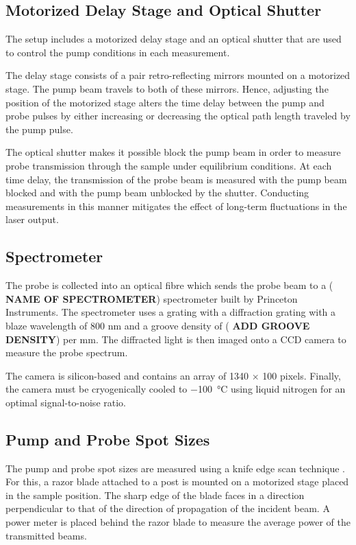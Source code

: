 \subsection{Motorized Delay Stage and Optical Shutter}

The setup includes a motorized delay stage and an optical shutter that are used to control the pump conditions in each measurement.

The delay stage consists of a pair retro-reflecting mirrors mounted on a motorized stage. The pump beam travels to both of these mirrors. Hence, adjusting the position of the motorized stage alters the time delay between the pump and probe pulses by either increasing or decreasing the optical path length traveled by the pump pulse. 

The optical shutter makes it possible block the pump beam in order to measure probe transmission through the sample under equilibrium conditions. At each time delay, the transmission of the probe beam is measured with the pump beam blocked and with the pump beam unblocked by the shutter. Conducting measurements in this manner mitigates the effect of long-term fluctuations in the laser output. 

\subsection{Spectrometer}
The probe is collected into an optical fibre which sends the probe beam to a (\textbf{\color{red} NAME OF SPECTROMETER}) spectrometer built by Princeton Instruments.  The spectrometer uses a grating with a diffraction grating with a blaze wavelength of 800 nm and a groove density of (\textbf{\color{red} ADD GROOVE DENSITY}) per mm. The diffracted light is then imaged onto a CCD camera to measure the probe spectrum. 

The camera is silicon-based and contains an array of 1340 $\times$ 100 pixels. Finally, the camera must be cryogenically cooled to \SI{-100}{\celsius} using liquid nitrogen for an optimal signal-to-noise ratio.


\subsection{Pump and Probe Spot Sizes}
The pump and probe spot sizes are measured using a knife edge scan technique \cite{firester1977knife}. For this, a razor blade attached to a post is mounted on a motorized stage placed in the sample position. The sharp edge of the blade faces in a direction perpendicular to that of the direction of propagation of the incident beam. A power meter is placed behind the razor blade to measure the average power of the transmitted beams.

